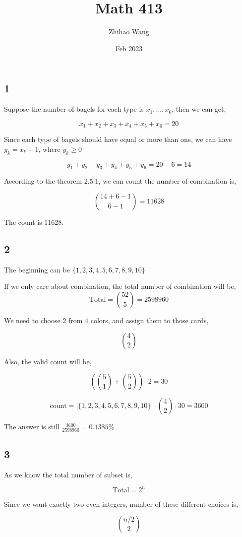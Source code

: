 \documentclass{article}
\title{Math 413}
\author{Zhihao Wang}
\date{Feb 2023}
\begin{document}
\maketitle

\subsection*{1}
Suppose the number of bagels for each type is $x_1, ..., x_6$, then we can get,

$$x_1 + x_2 + x_3 + x_4 + x_5 + x_6 = 20$$

Since each type of bagels should have equal or more than one, we can have $y_k = x_k - 1$, where $y_k \ge 0$

$$y_1 + y_2 + y_3 + y_4 + y_5 + y_6 = 20 - 6 = 14$$

According to the theorem 2.5.1, we can count the number of combination is,

$${{14 + 6 - 1} \choose {6 - 1}} = 11628$$

The count is 11628.

\subsection*{2}
The beginning can be $\{1, 2, 3, 4, 5, 6, 7 ,8 ,9 ,10 \}$

If we only care about combination, the total number of combination will be, 
$$\text{Total} = {52 \choose 5} = 2598960$$

We need to choose $2$ from $4$ colors, and assign them to those cards,

$${4 \choose 2}$$

Also, the valid count will be,

$$({5 \choose 1} + {5 \choose 2}) \cdot 2 = 30$$

$$\text{count} =  |\{1, 2, 3, 4, 5, 6, 7 ,8 ,9 ,10 \}| \cdot {4 \choose 2} \cdot 30 = 3600$$

The answer is still $\frac{3600}{2598960} = 0.1385 \%$

\subsection*{3}
As we know the total number of subset is,

$$\text{Total} = 2^n$$

Since we want exactly two even integers, number of these different choices is,

$${{n / 2} \choose 2}$$
\end{document}
